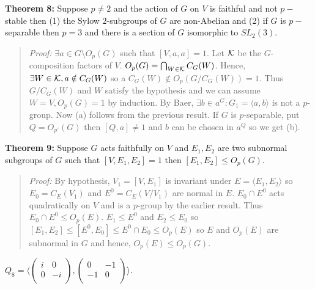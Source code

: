 {\bf Theorem 8:}
Suppose $p \ne 2$ and the action of
$G$ on $V$ is faithful and not $p-$stable then (1) the Sylow $2$-subgroups of
$G$ are non-Abelian and (2) if $G$ is $p-$separable 
then $p=3$ and there is a section of
$G$ isomorphic to $SL_2(3)$.
\begin{quote}
\emph{Proof:}  
$\exists a \in G \setminus O_p(G)$ such that $[V,a,a] = 1$.  Let ${\cal K}$ be the
$G$-composition factors of $V$.  $O_p(G)= \bigcap_{W \in {\cal K}} C_G(W)$.  Hence,
$\exists W \in {\cal K}, a \notin C_G(W)$ so a $C_G(W) \notin O_p(G/C_G(W)) = 1$.
Thus $G/C_G(W)$ and $W$ satisfy the hypothesis and we can assume $W=V, O_p(G)=1$ by
induction.  By Baer, $\exists b \in a^G: G_1 = \langle a,b \rangle $ is not a $p$-group.  Now
(a) follows from the previous result.  If $G$ is $p$-separable, put $Q= O_{p'}(G)$ then
$[Q, a] \ne 1$ and $b$ can be chosen in $a^Q$ so we get (b).
\end{quote}
{\bf Theorem 9:} Suppose $G$ acts faithfully on $V$ and $E_1 , E_2$ are
two subnormal subgroups of $G$ 
such that $[V,E_1 , E_2 ]=1$ then $[E_1 , E_2 ] \le O_p (G)$.
\begin{quote}
\emph{Proof:}  
By hypothesis, $V_1= [V, E_1]$ is invariant under $E= \langle E_1 , E_2 \rangle $ so
$E_0 = C_E(V_1)$ and $E^0= C_E(V/V_1)$ are normal in $E$.
$E_0 \cap E^0$ acts quadratically on $V$ and is a $p$-group by the earlier result.
Thus $E_0 \cap E^0 \le O_p(E)$.
$E_1 \le E^0$ and
$E_2 \le E_0$ so $[E_1 , E_2 ] \le [E^0 , E_0] \le E^0 \cap E_0 \le O_p(E)$ so
$E$ and $O_p(E)$ are subnormal in $G$ and hence, $O_p(E) \le O_p(G)$.
\end{quote}
$Q_8= \langle
\left(
\begin{array}{cc}
i & 0 \\
0 & -i \\
\end{array}
\right),
\left( 
\begin{array}{cc}
0 & -1 \\
-1 & 0 \\
\end{array}
\right) \rangle $.
